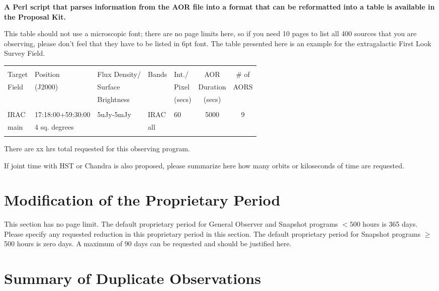 \documentclass[letterpaper,12pt]{article}
\begin{document}
{\bf A Perl script that parses information from the AOR file into 
a format that can be reformatted into a table is available in the Proposal Kit.}\newline

This table should not use a microscopic font; there are no page
limits here, so if you need 10 pages to list all 400 sources that
you are observing, please don't feel that they have to be listed
in 6pt font. The table presented here is an example for the extragalactic 
First Look Survey Field.\newline

\bigskip
\begin{tabular}{lllllcc}
\hline \\ 
Target & Position & Flux Density/       & Bands  & Int./ & AOR & \# of \\
Field & (J2000)   & Surface &  & Pixel & Duration & AORS \\
& & Brightness & & (secs) & (secs) & \\
\hline \\ 
IRAC & 17:18:00+59:30:00 & 5uJy-5mJy & IRAC & 60 & 5000 & 9 \\
main & 4 sq. degrees & & all& & &  \\
\hline \\
\end{tabular}

There are xx hrs total requested for this observing program.\newline

If joint time with HST or Chandra is also proposed, please summarize 
here how many orbits or kiloseconds of time are requested.


\section{Modification of the Proprietary Period}

This section has no page limit. The default proprietary period for General 
Observer and Snapshot programs $< 500$ hours is 365 days. 
Please specify any requested reduction in this proprietary period in this section.
The default proprietary period for Snapshot programs $\ge$ 500 hours is zero days.
A maximum of 90 days can be requested and should be justified here.

\section{Summary of Duplicate Observations}
\end{document}
